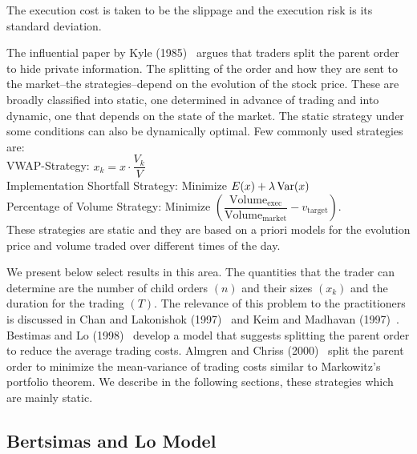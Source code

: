 The execution cost is taken to be the slippage and the execution risk is its standard deviation. 


The influential paper by Kyle (1985)~\cite{kyle1985} argues that traders split the parent order to hide private information. The splitting of the order and how they are sent to the market--the strategies--depend on the evolution of the stock price. These are broadly classified into static, one determined in advance of trading and into dynamic, one that depends on the state of the market. The static strategy under some conditions can also be dynamically optimal. Few commonly used strategies are: \\

VWAP-Strategy: $x_k=x \cdot \dfrac{V_k}{V}$ \\

Implementation Shortfall Strategy: Minimize $E(x)+\lambda \operatorname{Var}(x)$ \\

Percentage of Volume Strategy: Minimize $\left(\dfrac{\text{Volume}_{\text{exec}}}{\text{Volume}_{\text{market}}} - v_{\text{target}}\right).$ \\

\noindent These strategies are static and they are based on a priori models for the evolution price and volume traded over different times of the day. 


We present below select results in this area. The quantities that the trader can determine are the number of child orders $(n)$ and their sizes $(x_k)$ and the duration for the trading $(T)$. The relevance of this problem to the practitioners is discussed in Chan and Lakonishok (1997)~\cite{lakon} and Keim and Madhavan (1997)~\cite{madhavan}. Bestimas and Lo (1998)~\cite{berlo} develop a model that suggests splitting the parent order to reduce the average trading costs. Almgren and Chriss (2000)~\cite{alm2000} split the parent order to minimize the mean-variance of trading costs similar to Markowitz's portfolio theorem. We describe in the following sections, these strategies which are mainly static. 


\subsection{Bertsimas and Lo Model}


